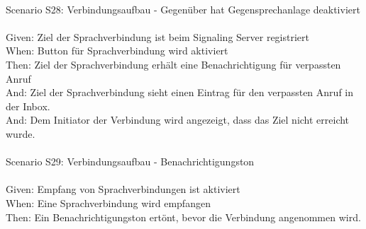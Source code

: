 \begin{tabbing}
    \\
    Scenario S28: \> \> \> Verbindungsaufbau - Gegenüber hat Gegensprechanlage deaktiviert \\ \\
    Given:  \> \> \> Ziel der Sprachverbindung ist beim Signaling Server registriert\\
    When:   \> \> \> Button für Sprachverbindung wird aktiviert\\
    Then:   \> \> \> Ziel der Sprachverbindung erhält eine Benachrichtigung für verpassten Anruf\\
    And:   \> \> \> Ziel der Sprachverbindung sieht einen Eintrag für den verpassten Anruf in der Inbox.\\
    And:   \> \> \> Dem Initiator der Verbindung wird angezeigt, dass das Ziel nicht erreicht wurde. \\
    \\
    Scenario S29: \> \> \> Verbindungsaufbau - Benachrichtigungston \\ \\
    Given:  \> \> \> Empfang von Sprachverbindungen ist aktiviert\\
    When:   \> \> \> Eine Sprachverbindung wird empfangen\\
    Then:   \> \> \> Ein Benachrichtigungston ertönt, bevor die Verbindung angenommen wird.\\
\end{tabbing}
\clearpage
